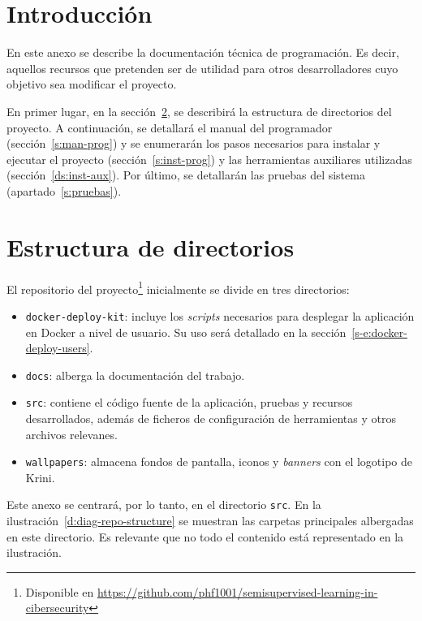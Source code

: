
\section{Introducción}

En este anexo se describe la documentación técnica de programación. Es decir, aquellos recursos que pretenden ser de utilidad para otros desarrolladores cuyo objetivo sea modificar el proyecto.

En primer lugar, en la sección~\ref{s:estructura-dirs}, se describirá la estructura de directorios del proyecto. A continuación, se detallará el manual del programador (sección~\ref{s:man-prog}) y se enumerarán los pasos necesarios para instalar y ejecutar el proyecto (sección~\ref{s:inst-prog}) y las herramientas auxiliares utilizadas (sección~\ref{ds:inst-aux}). Por último, se detallarán las pruebas del sistema (apartado~\ref{s:pruebas}).

\section{Estructura de directorios}
\label{s:estructura-dirs}

El repositorio del proyecto\footnote{Disponible en \url{https://github.com/phf1001/semisupervised-learning-in-cibersecurity}} inicialmente se divide en tres directorios:

\begin{itemize}
	\item \texttt{docker-deploy-kit}: incluye los \textit{scripts} necesarios para desplegar la aplicación en Docker a nivel de usuario. Su uso será detallado en la sección~\ref{s-e:docker-deploy-users}.
	\item \texttt{docs}: alberga la documentación del trabajo.
	\item \texttt{src}: contiene el código fuente de la aplicación, pruebas y recursos desarrollados, además de ficheros de configuración de herramientas y otros archivos relevanes.
	\item \texttt{wallpapers}: almacena fondos de pantalla, iconos y \textit{banners} con el logotipo de Krini.
\end{itemize}

Este anexo se centrará, por lo tanto, en el directorio \texttt{src}. En la ilustración~\ref{d:diag-repo-structure} se muestran las carpetas principales albergadas en este directorio. Es relevante que no todo el contenido está representado en la ilustración.

